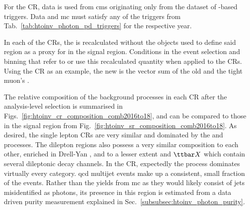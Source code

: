 For the \singlePhotonCr \gls{CR}, data is used from \acrshort{cms} originating only from the dataset of \Pphoton-based triggers. Data and \acrshort{mc} must satisfy any of the triggers from Tab.~\ref{tab:htoinv_photon_pd_triggers} for the respective year.

In each of the \glspl{CR}, the \ptvecmiss is recalculated without the objects used to define said region as a proxy for \ptvecmiss in the signal region. Conditions in the event selection and binning that refer to \ptvecmiss or \ptmiss use this recalculated quantity when applied to the \glspl{CR}. Using the \singleMuCr \gls{CR} as an example, the new \ptvecmiss is the vector sum of the old \ptvecmiss and the tight muon's \ptvec.

The relative composition of the background processes in each \gls{CR} after the analysis-level selection is summarised in Figs.~\ref{fig:htoinv_cr_composition_comb2016to18}, and can be compared to those in the signal region from Fig.~\ref{fig:htoinv_sr_composition_comb2016to18}. As desired, the single lepton \glspl{CR} are very similar and dominated by the \ttbar and \wtolnu processes. The dilepton regions also possess a very similar composition to each other, enriched in Drell-Yan \ztoll, and to a lesser extent \ttbar and $\ttbar X$ which contain several dileptonic decay channels. In the \singlePhotonCr \gls{CR}, expectedly the \gammapjets process dominates virtually every category. \acrshort{qcd} multijet events make up a consistent, small fraction of the events. Rather than the yields from \acrshort{mc} as they would likely consist of \glspl{jet} misidentified as photons, its presence in this region is estimated from a data driven purity measurement explained in Sec.~\ref{subsubsec:htoinv_photon_purity}.

